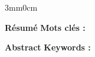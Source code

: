 
\thispagestyle{backcover}

\begin{changemargin}{3mm}{0cm}
    \begin{minipage}[c]{0.96\columnwidth}

        \vskip8mm


        {\LARGE\textbf{Résumé}}
        \vskip1mm
            \begingroup
                \large
                \@frenchAbstract
            \endgroup
        \vskip1mm
        {\textbf{Mots clés : }
            \begingroup
                \@frenchAbstractKeywords
            \endgroup
        }

        \vskip8mm

        {\LARGE\textbf{Abstract}}
        \vskip1mm
            \begingroup
                \large
                \@englishAbstract
            \endgroup
        \vskip1mm
        {\textbf{Keywords : }
            \begingroup
                \@englishAbstractKeywords
            \endgroup
        }
    \end{minipage}

\end{changemargin}

